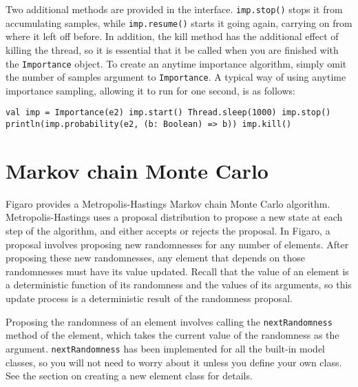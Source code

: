 Two additional methods are provided in the interface. \texttt{imp.stop()} stops it from accumulating samples, while \texttt{imp.resume()} starts it going again, carrying on from where it left off before. In addition, the kill method has the additional effect of killing the thread, so it is essential that it be called when you are finished with the \texttt{Importance} object. To create an anytime importance algorithm, simply omit the number of samples argument to \texttt{Importance}. A typical way of using anytime importance sampling, allowing it to run for one second, is as follows:

\begin{flushleft}
\texttt{val imp = Importance(e2) 
\newline imp.start() 
\newline Thread.sleep(1000) 
\newline imp.stop()
\newline println(imp.probability(e2, (b: Boolean) => b))
\newline imp.kill() }
\end{flushleft}

\section{Markov chain Monte Carlo}

Figaro provides a Metropolis-Hastings Markov chain Monte Carlo algorithm. Metropolis-Hastings uses a proposal distribution to propose a new state at each step of the algorithm, and either accepts or rejects the proposal. In Figaro, a proposal involves proposing new randomnesses for any number of elements. After proposing these new randomnesses, any element that depends on those randomnesses must have its value updated. Recall that the value of an element is a deterministic function of its randomness and the values of its arguments, so this update process is a deterministic result of the randomness proposal.

Proposing the randomness of an element involves calling the \texttt{next\-Randomness} method of the element, which takes the current value of the randomness as the argument. \texttt{nextRandomness} has been implemented for all the built-in model classes, so you will not need to worry about it unless you define your own class. See the section on creating a new element class for details.

